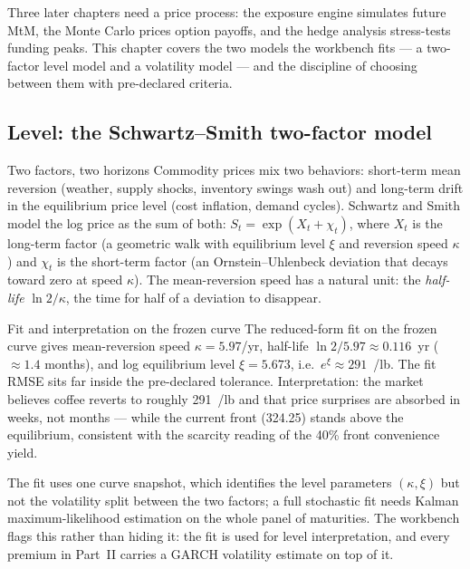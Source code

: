 \documentclass[11pt,a4paper]{article}
\begin{document}
Three later chapters need a price process: the exposure engine simulates
future MtM, the Monte Carlo prices option payoffs, and the hedge analysis
stress-tests funding peaks. This chapter covers the two models the
workbench fits --- a two-factor level model and a volatility model --- and
the discipline of choosing between them with pre-declared criteria.

\subsection{Level: the Schwartz--Smith two-factor model}

\begin{concept}{Two factors, two horizons}
Commodity prices mix two behaviors: short-term mean reversion (weather,
supply shocks, inventory swings wash out) and long-term drift in the
equilibrium price level (cost inflation, demand cycles). Schwartz and
Smith \cite{schwartzsmith00} model the log price as the sum of both:
$S_t = \exp(X_t + \chi_t)$, where $X_t$ is the long-term factor (a
geometric walk with equilibrium level $\xi$ and reversion speed $\kappa$)
and $\chi_t$ is the short-term factor (an Ornstein--Uhlenbeck deviation
that decays toward zero at speed $\kappa$). The mean-reversion speed has a
natural unit: the \emph{half-life} $\ln 2 / \kappa$, the time for half of
a deviation to disappear.
\end{concept}

\begin{concept}{Fit and interpretation on the frozen curve}
The reduced-form fit on the frozen curve gives mean-reversion speed
$\kappa = 5.97$/yr, half-life $\ln 2 / 5.97 \approx 0.116$~yr
($\approx 1.4$ months), and log equilibrium level $\xi = 5.673$, i.e.\
$e^{\xi} \approx 291$~\textcent/lb. The fit RMSE sits far inside the
pre-declared tolerance. Interpretation: the market believes coffee
reverts to roughly 291~\textcent/lb and that price surprises are absorbed
in weeks, not months --- while the current front (324.25) stands above the
equilibrium, consistent with the scarcity reading of the 40\% front
convenience yield.
\end{concept}

\begin{pitfall}
The fit uses one curve snapshot, which identifies the level parameters
$(\kappa, \xi)$ but not the volatility split between the two factors; a
full stochastic fit needs Kalman maximum-likelihood estimation on the
whole panel of maturities. The workbench flags this rather than hiding
it: the fit is used for level interpretation, and every premium in
Part~II carries a GARCH volatility estimate on top of it.
\end{pitfall}
\end{document}
